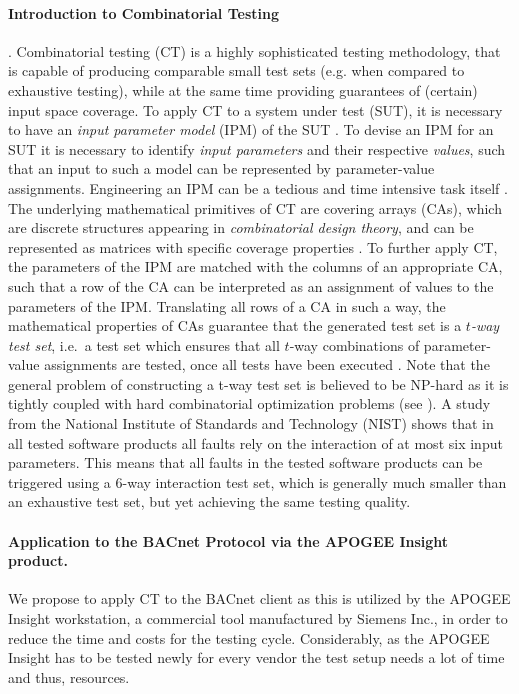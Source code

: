 \documentclass[runningheads]{llncs}
\newcommand{\apogee}{APOGEE Insight\textsuperscript{\tiny{\textregistered}}}
\begin{document}
\paragraph{Introduction to Combinatorial Testing}. Combinatorial testing (CT) is a highly sophisticated testing methodology,
that is capable of producing comparable small test sets (e.g. when compared to exhaustive testing),
while at the same time providing guarantees of (certain) input space coverage.
To apply CT to a system under test (SUT), it is necessary to have an \emph{input parameter model} (IPM) of the SUT \cite{OffuttIPM}.
To devise an IPM for an SUT it is necessary to identify \emph{input parameters} and their respective \emph{values},
such that an input to such a model can be represented by parameter-value assignments.
Engineering an IPM can be a tedious and time intensive task itself \cite{rework}.
The underlying mathematical primitives of CT are covering arrays (CAs), which are discrete structures appearing in \emph{combinatorial design theory},
and can be represented as matrices with specific coverage properties \cite{NISTpractical}.
To further apply CT, the parameters of the IPM are matched with the columns of an appropriate CA,
such that a row of the CA can be interpreted as an assignment of values to the parameters of the IPM.
Translating all rows of a CA in such a way, the mathematical properties of CAs guarantee that the generated test set
is a \emph{$t$-way test set}, i.e.\ a test set which ensures that all $t$-way combinations of parameter-value assignments are tested,
once all tests have been executed \cite{NISTpractical}. Note that the general problem of constructing a t-way test set is believed to be NP-hard as it is tightly coupled with hard combinatorial optimization problems (see \cite{CHENG20071943}).
A study from the National Institute of Standards and Technology (NIST) \cite{NISTpractical} shows
that in all tested software products all faults rely on the interaction of at most six input parameters.
This means that all faults in the tested software products can be triggered using a $6$-way interaction test set,
which is generally much smaller than an exhaustive test set, but yet achieving the same testing quality.



\paragraph{Application to the BACnet Protocol via the \apogee{} product.}
We propose to apply CT to the BACnet client as this is utilized by the \apogee{} workstation, a commercial tool manufactured by Siemens Inc.,
in order to reduce the time and costs for the testing cycle. Considerably, as the \apogee{} has to be tested newly for every vendor the test setup needs a lot of time and thus, resources.
\end{document}
